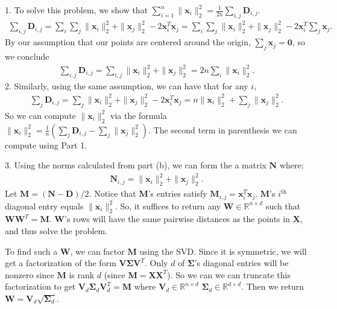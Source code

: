 \documentclass[11pt]{article}
\newcommand{\bs}[1]{\boldsymbol{#1}}
\newcommand{\bv}[1]{\mathbf{#1}}
\newcommand{\R}{\mathbb{R}}
\begin{document}
			1. To solve this problem, we show that $\sum_{i=1}^n \|\bv{x}_i\|_2^2 = \frac{1}{2n}\sum_{i,j} \bv{D}_{i,j}$.
			\begin{align*}
				\sum_{i,j} \bv{D}_{i,j} = \sum_{i} \sum_{j} \|\bv{x}_i\|_2^2 + \|\bv{x}_j\|_2^2 - 2\bv{x}_i^T\bv{x}_j = \sum_{i} \sum_{j} \|\bv{x}_i\|_2^2 + \|\bv{x}_j\|_2^2 - 2\bv{x}_i^T\sum_{j} \bv{x}_j.
			\end{align*}
			By our assumption that our points are centered around the origin, $\sum_{j} \bv{x}_j = \bv{0}$, so we conclude 
			\begin{align*}
			\sum_{i,j} \bv{D}_{i,j} = \sum_{i,j} \|\bv{x}_i\|_2^2 + \|\bv{x}_j\|_2^2 = 2n \sum_{i} \|\bv{x}_i\|_2^2.
			\end{align*}
			2. Similarly, using the same assumption, we can have that for any $i$, 
			\begin{align*}
			\sum_{j} \bv{D}_{i,j} =\sum_{j} \|\bv{x}_i\|_2^2 + \|\bv{x}_j\|_2^2 - 2\bv{x}_i^T\bv{x}_j = n \|\bv{x}_i\|_2^2 + \sum_j \|\bv{x}_j\|_2^2.
			\end{align*}
			So we can compute $\|\bv{x}_i\|_2^2$ via the formula $\|\bv{x}_i\|_2^2 = \frac{1}{n}\left(\sum_{j} \bv{D}_{i,j} - \sum_{j} \|\bv{x}_j\|_2^2\right)$. The second term in parenthesis we can compute using Part 1. 
			
			3. Using the norms calculated from part (b), we can form the a matrix $\bv{N}$ where;
			\begin{align*}
			\bv{N}_{i,j} = \|\bv{x}_i\|_2^2 + \|\bv{x}_j\|_2^2.
			\end{align*}
			Let $\bv{M} = (\bv{N} - \bv{D})/2$. Notice that $\bv{M}$'s entries satisfy $\bv{M}_{i,j} = \bv{x}_i^T\bv{x}_j$. $\bv{M}$'s $i^\text{th}$ diagonal entry equals $\|\bv{x}_i\|_2^2$. So, it suffices to return any $\bv{W} \in \R^{n\times d}$ such that $\bv{W}\bv{W}^T = \bv{M}$. $\bv{W}$'s rows will have the same pairwise distances as the points in $\bv{X}$, and thus solve the problem. 
			
			To find such a $\bv{W}$, we can factor $\bv{M}$ using the SVD. Since it is symmetric, we will get a factorization of the form $\bv{V}\bs{\Sigma}\bv{V}^T$. Only $d$ of $\bs{\Sigma}$'s diagonal entries will be nonzero since $\bv{M}$ is rank $d$ (since $\bv{M} = \bv{X}\bv{X}^T$). So we can we can truncate this factorization to get $\bv{V}_d\bs{\Sigma}_d\bv{V}_d^T = \bv{M}$ where $\bv{V}_d \in \R^{n\times d}$ $\bs{\Sigma}_d\in \R^{d\times d}$. Then we return $\bv{W} =\bv{V}_d \sqrt{\bs{\Sigma}_d}$. 





	
\end{document}
